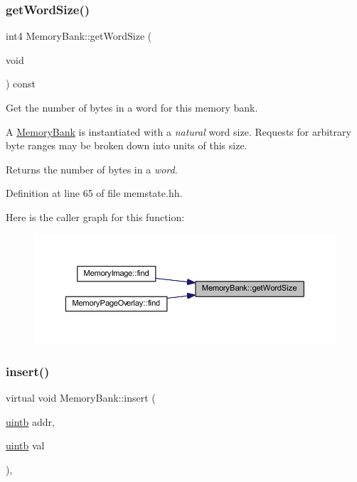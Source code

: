 \subsubsection{\texorpdfstring{getWordSize()}{getWordSize()}}
{\footnotesize\ttfamily int4 Memory\+Bank\+::get\+Word\+Size (\begin{DoxyParamCaption}\item[{void}]{ }\end{DoxyParamCaption}) const\hspace{0.3cm}{\ttfamily [inline]}}



Get the number of bytes in a word for this memory bank. 

A \mbox{\hyperlink{class_memory_bank}{Memory\+Bank}} is instantiated with a {\itshape natural} word size. Requests for arbitrary byte ranges may be broken down into units of this size. \begin{DoxyReturn}{Returns}
the number of bytes in a {\itshape word}. 
\end{DoxyReturn}


Definition at line 65 of file memstate.\+hh.

Here is the caller graph for this function\+:
\nopagebreak
\begin{figure}[H]
\begin{center}
\leavevmode
\includegraphics[width=350pt]{class_memory_bank_a996d7c04af8f8bf02ce7abb91d693dc5_icgraph}
\end{center}
\end{figure}
\mbox{\label{class_memory_bank_abccbb8ba1e2c2ae941b372e90f454e5f}} 
\subsubsection{\texorpdfstring{insert()}{insert()}}
{\footnotesize\ttfamily virtual void Memory\+Bank\+::insert (\begin{DoxyParamCaption}\item[{\mbox{\hyperlink{types_8h_a2db313c5d32a12b01d26ac9b3bca178f}{uintb}}}]{addr,  }\item[{\mbox{\hyperlink{types_8h_a2db313c5d32a12b01d26ac9b3bca178f}{uintb}}}]{val }\end{DoxyParamCaption})\hspace{0.3cm}{\ttfamily [protected]}, {}}



